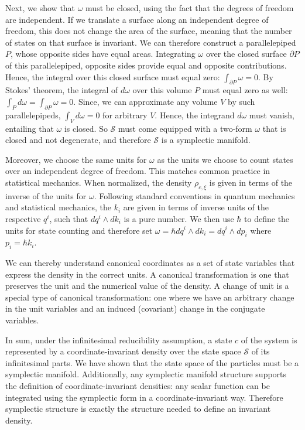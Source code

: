 \documentclass[12pt, twoside]{article}
\begin{document}
Next, we show that $\omega$ must be closed, using the fact that the degrees of freedom are independent. If we translate a surface along an independent degree of freedom, this does not change the area of the surface, meaning that the number of states on that surface is invariant. We can therefore construct a parallelepiped $P$, whose opposite sides have equal areas. Integrating $\omega$ over the closed surface $\partial P$ of this parallelepiped, opposite sides provide equal and opposite contributions. Hence, the integral over this closed surface must equal zero: $\int_{\partial P} \omega =0$. By Stokes' theorem, the integral of $d \omega$ over this volume $P$ must equal zero as well: $\int_P d \omega = \int_{\partial P} \omega =0$. Since, we can approximate any volume $V$ by such parallelepipeds, $\int_V d \omega = 0$ for arbitrary $V$. Hence, the integrand $d \omega$ must vanish, entailing that $\omega$ is closed. So $\mathcal{S}$ must come equipped with a two-form $\omega$ that is closed and not degenerate, and therefore $\mathcal{S}$ is a symplectic manifold.

Moreover, we choose the same units for $\omega$ as the units we choose to count states over an independent degree of freedom. This matches common practice in statistical mechanics. When normalized, the density $\rho_{c, \xi}$ is given in terms of the inverse of the units for $\omega$. Following standard conventions in quantum mechanics and statistical mechanics, the $k_i$ are given in terms of inverse units of the respective $q^i$, such that $dq^i \wedge dk_i$ is a pure number. We then use $\hbar$ to define the units for state counting and therefore set $\omega = \hbar dq^i \wedge dk_i = dq^i \wedge dp_i$ where $p_i = \hbar k_i$.


We can thereby understand canonical coordinates as a set of state variables that express the density in the correct units. A canonical transformation is one that preserves the unit and the numerical value of the density. A change of unit is a special type of canonical transformation: one where we have an arbitrary change in the unit variables and an induced (covariant) change in the conjugate variables.
 
 
In sum, under the infinitesimal reducibility assumption, a state $c$ of the system is represented by a coordinate-invariant density over the state space $\mathcal{S}$ of its infinitesimal parts. We have shown that the state space of the particles must be a symplectic manifold. Additionally, any symplectic manifold structure supports the definition of coordinate-invariant densities: any scalar function can be integrated using the symplectic form in a coordinate-invariant way. Therefore symplectic structure is exactly the structure needed to define an invariant density. 
\end{document}
